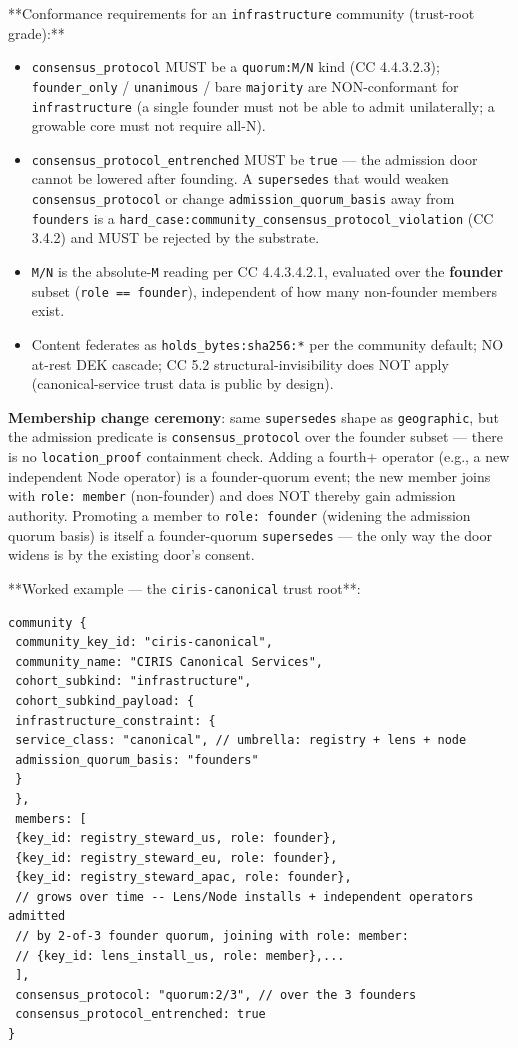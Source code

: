 \documentclass[11pt]{article}
\begin{document}
**Conformance requirements for an \texttt{infrastructure} community (trust-root grade):**


\begin{itemize}\setlength\itemsep{0pt}
\item \texttt{consensus\_protocol} MUST be a \texttt{quorum:M/N} kind (CC 4.4.3.2.3); \texttt{founder\_only} / \texttt{unanimous} / bare \texttt{majority} are NON-conformant for \texttt{infrastructure} (a single founder must not be able to admit unilaterally; a growable core must not require all-N).
\item \texttt{consensus\_protocol\_entrenched} MUST be \texttt{true} — the admission door cannot be lowered after founding. A \texttt{supersedes} that would weaken \texttt{consensus\_protocol} or change \texttt{admission\_quorum\_basis} away from \texttt{founders} is a \texttt{hard\_case:community\_consensus\_protocol\_violation} (CC 3.4.2) and MUST be rejected by the substrate.
\item \texttt{M/N} is the absolute-\texttt{M} reading per CC 4.4.3.4.2.1, evaluated over the \textbf{founder} subset (\texttt{role == founder}), independent of how many non-founder members exist.
\item Content federates as \texttt{holds\_bytes:sha256:*} per the community default; NO at-rest DEK cascade; CC 5.2 structural-invisibility does NOT apply (canonical-service trust data is public by design).
\end{itemize}


\textbf{Membership change ceremony}: same \texttt{supersedes} shape as \texttt{geographic}, but the admission predicate is \texttt{consensus\_protocol} over the founder subset — there is no \texttt{location\_proof} containment check. Adding a fourth+ operator (e.g., a new independent Node operator) is a founder-quorum event; the new member joins with \texttt{role: member} (non-founder) and does NOT thereby gain admission authority. Promoting a member to \texttt{role: founder} (widening the admission quorum basis) is itself a founder-quorum \texttt{supersedes} — the only way the door widens is by the existing door's consent.


**Worked example — the \texttt{ciris-canonical} trust root**:


\begin{lstlisting}
community {
 community_key_id: "ciris-canonical",
 community_name: "CIRIS Canonical Services",
 cohort_subkind: "infrastructure",
 cohort_subkind_payload: {
 infrastructure_constraint: {
 service_class: "canonical", // umbrella: registry + lens + node
 admission_quorum_basis: "founders"
 }
 },
 members: [
 {key_id: registry_steward_us, role: founder},
 {key_id: registry_steward_eu, role: founder},
 {key_id: registry_steward_apac, role: founder},
 // grows over time -- Lens/Node installs + independent operators admitted
 // by 2-of-3 founder quorum, joining with role: member:
 // {key_id: lens_install_us, role: member},...
 ],
 consensus_protocol: "quorum:2/3", // over the 3 founders
 consensus_protocol_entrenched: true
}
\end{lstlisting}
\end{document}
